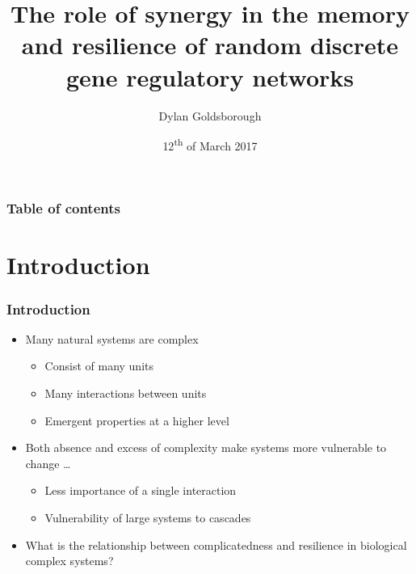 \documentclass[hyperref={pdfpagelabels=false}]{beamer}
\title{The role of synergy in the memory and resilience of random discrete gene regulatory networks}
\author{Dylan Goldsborough}
\date{12\textsuperscript{th} of March 2017}
\begin{document}
\begin{frame}
\titlepage
\end{frame} 

\begin{frame}
\frametitle{Table of contents}
\tableofcontents
\end{frame} 


\section{Introduction} 
\setcounter{subsection}{1}

%
\begin{frame}
\frametitle{Introduction}
\begin{itemize}
\item Many natural systems are complex
\begin{itemize}
\item Consist of many units
\item Many interactions between units
\item Emergent properties at a higher level
\end{itemize}
\item Both absence and excess of complexity make systems more vulnerable to change \cite{kondoh2003foraging, macarthur1955fluctuations} \dots{}
\begin{itemize}
\item Less importance of a single interaction
\item Vulnerability of large systems to cascades
\end{itemize}
\item What is the relationship between complicatedness and resilience in biological complex systems? 
\end{itemize}
\end{frame}
\end{document}
